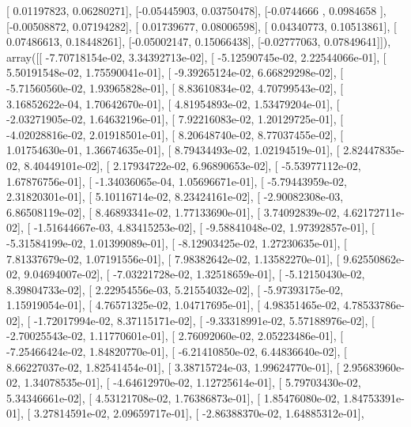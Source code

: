 \documentclass{article}
\begin{document}
       [ 0.01197823,  0.06280271],
       [-0.05445903,  0.03750478],
       [-0.0744666 ,  0.0984658 ],
       [-0.00508872,  0.07194282],
       [ 0.01739677,  0.08006598],
       [ 0.04340773,  0.10513861],
       [ 0.07486613,  0.18448261],
       [-0.05002147,  0.15066438],
       [-0.02777063,  0.07849641]]), array([[ -7.70718154e-02,   3.34392713e-02],
       [ -5.12590745e-02,   2.22544066e-01],
       [  5.50191548e-02,   1.75590041e-01],
       [ -9.39265124e-02,   6.66829298e-02],
       [ -5.71560560e-02,   1.93965828e-01],
       [  8.83610834e-02,   4.70799543e-02],
       [  3.16852622e-04,   1.70642670e-01],
       [  4.81954893e-02,   1.53479204e-01],
       [ -2.03271905e-02,   1.64632196e-01],
       [  7.92216083e-02,   1.20129725e-01],
       [ -4.02028816e-02,   2.01918501e-01],
       [  8.20648740e-02,   8.77037455e-02],
       [  1.01754630e-01,   1.36674635e-01],
       [  8.79434493e-02,   1.02194519e-01],
       [  2.82447835e-02,   8.40449101e-02],
       [  2.17934722e-02,   6.96890653e-02],
       [ -5.53977112e-02,   1.67876756e-01],
       [ -1.34036065e-04,   1.05696671e-01],
       [ -5.79443959e-02,   2.31820301e-01],
       [  5.10116714e-02,   8.23424161e-02],
       [ -2.90082308e-03,   6.86508119e-02],
       [  8.46893341e-02,   1.77133690e-01],
       [  3.74092839e-02,   4.62172711e-02],
       [ -1.51644667e-03,   4.83415253e-02],
       [ -9.58841048e-02,   1.97392857e-01],
       [ -5.31584199e-02,   1.01399089e-01],
       [ -8.12903425e-02,   1.27230635e-01],
       [  7.81337679e-02,   1.07191556e-01],
       [  7.98382642e-02,   1.13582270e-01],
       [  9.62550862e-02,   9.04694007e-02],
       [ -7.03221728e-02,   1.32518659e-01],
       [ -5.12150430e-02,   8.39804733e-02],
       [  2.22954556e-03,   5.21554032e-02],
       [ -5.97393175e-02,   1.15919054e-01],
       [  4.76571325e-02,   1.04717695e-01],
       [  4.98351465e-02,   4.78533786e-02],
       [ -1.72017994e-02,   8.37115171e-02],
       [ -9.33318991e-02,   5.57188976e-02],
       [ -2.70025543e-02,   1.11770601e-01],
       [  2.76092060e-02,   2.05223486e-01],
       [ -7.25466424e-02,   1.84820770e-01],
       [ -6.21410850e-02,   6.44836640e-02],
       [  8.66227037e-02,   1.82541454e-01],
       [  3.38715724e-03,   1.99624770e-01],
       [  2.95683960e-02,   1.34078535e-01],
       [ -4.64612970e-02,   1.12725614e-01],
       [  5.79703430e-02,   5.34346661e-02],
       [  4.53121708e-02,   1.76386873e-01],
       [  1.85476080e-02,   1.84753391e-01],
       [  3.27814591e-02,   2.09659717e-01],
       [ -2.86388370e-02,   1.64885312e-01],
\end{document}
